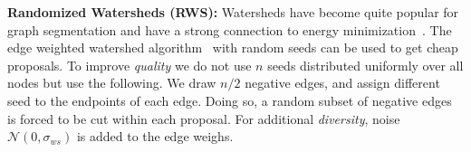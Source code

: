 \documentclass[10pt,twocolumn,letterpaper]{article}
\theoremstyle{definition}
\begin{document}
%

\noindent \textbf{Randomized Watersheds (RWS):}
Watersheds have become quite popular for
graph segmentation and have a strong connection
to energy minimization~\cite{couprie_2011}.
%
The edge weighted watershed algorithm~\cite{meyer_2013}
with random seeds can be used to get
cheap proposals.
To improve \emph{quality} we do not use $n$ seeds distributed uniformly
over all nodes but use the following.
%
We draw $n/2$ negative edges, and assign different seed to the endpoints
of each edge.
Doing so, a random subset of negative edges is forced
to be cut within each proposal.
For additional \emph{diversity}, noise $\mathcal{N} (0, \sigma_{ws})$
is added to the edge weighs.

%


\end{document}
